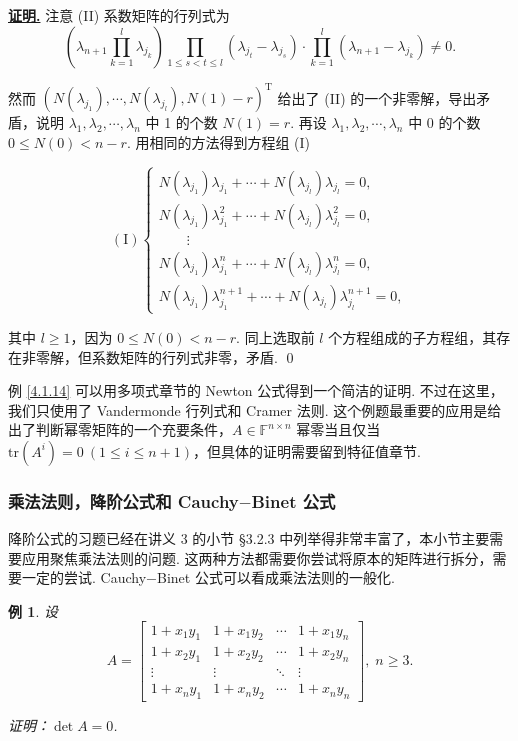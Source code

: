 \documentclass[10pt,openany]{article}
\theoremstyle{thmstyle} %
\theoremstyle{defstyle} %
\theoremstyle{prostyle} %
\theoremstyle{exastyle}
\newtheorem{example}[theorem]{例}
\theoremstyle{remstyle}
\renewenvironment{proof}[1][证明]{\par\underline{\textbf{#1.}} \;\fangsong}{\qed\par}
\newcommand{\T}{^{\text{T}}}
\newcommand{\F}{\mathbb{F}}
\newcommand{\n}{^{n \times n}}
\newcommand{\tr}{\mathrm{tr}}
\begin{document}
\begin{proof}
    注意 (II) 系数矩阵的行列式为
    \[\left( \lambda_{n+1} \prod_{k=1}^{l} \lambda_{j_k}  \right) \prod_{1 \leq s < t \leq l}^{} (\lambda_{j_t}-\lambda_{j_s}) \cdot \prod_{k=1}^{l} (\lambda_{n+1}-\lambda_{j_k}) \neq 0. \]
    
    然而 \( (N(\lambda_{j_1}),\cdots,N(\lambda_{j_l}),N(1)-r)\T \) 给出了 (II) 的一个非零解，导出矛盾，说明 \( \lambda_1,\lambda_2,\cdots,\lambda_n \) 中 1 的个数 \( N(1)=r \). 再设 \( \lambda_1,\lambda_2,\cdots,\lambda_n \) 中 0 的个数 \( 0 \leq N(0)< n-r \). 用相同的方法得到方程组 (I)
    
     \[ (\text{I}) \left\{ \begin{array}{l}
    	N(\lambda_{j_1}) \lambda_{j_1}+\cdots+N(\lambda_{j_l})\lambda_{j_l}= 0,\\
    	N(\lambda_{j_1}) \lambda_{j_1}^{2}+\cdots+N(\lambda_{j_l})\lambda_{j_l}^{2}= 0,\\
    	\qquad \vdots\\
    	N(\lambda_{j_1}) \lambda_{j_1}^{n}+\cdots+N(\lambda_{j_l})\lambda_{j_l}^{n}= 0,\\
    	N(\lambda_{j_1}) \lambda_{j_1}^{n+1}+\cdots+N(\lambda_{j_l})\lambda_{j_l}^{n+1}= 0,
    \end{array}\right.\]
    
    其中 \( l \geq 1 \)，因为 \( 0 \leq N(0)<n-r \). 同上选取前 \( l \) 个方程组成的子方程组，其存在非零解，但系数矩阵的行列式非零，矛盾.
\end{proof}

例 \ref{4.1.14} 可以用多项式章节的 Newton 公式得到一个简洁的证明. 不过在这里，我们只使用了 Vandermonde 行列式和 Cramer 法则. 这个例题最重要的应用是给出了判断幂零矩阵的一个充要条件，\( A \in \F\n \) 幂零当且仅当 \( \tr(A^i)=0 \ (1 \leq i \leq n+1) \)，但具体的证明需要留到特征值章节.

\subsubsection{乘法法则，降阶公式和 Cauchy\(-\)Binet 公式}

降阶公式的习题已经在讲义 3 的小节 \S 3.2.3 中列举得非常丰富了，本小节主要需要应用聚焦乘法法则的问题. 这两种方法都需要你尝试将原本的矩阵进行拆分，需要一定的尝试. Cauchy\(-\)Binet 公式可以看成乘法法则的一般化.

\begin{example}
	设
	\[
	A =
	\begin{bmatrix}
		1 + x_1 y_1 & 1 + x_1 y_2 & \cdots & 1 + x_1 y_n \\
		1 + x_2 y_1 & 1 + x_2 y_2 & \cdots & 1 + x_2 y_n \\
		\vdots & \vdots & \ddots & \vdots \\
		1 + x_n y_1 & 1 + x_n y_2 & \cdots & 1 + x_n y_n
	\end{bmatrix}, \; n \geq 3.
	\]
	
	证明：\( \det A=0 \).
\end{example}
\end{document}
